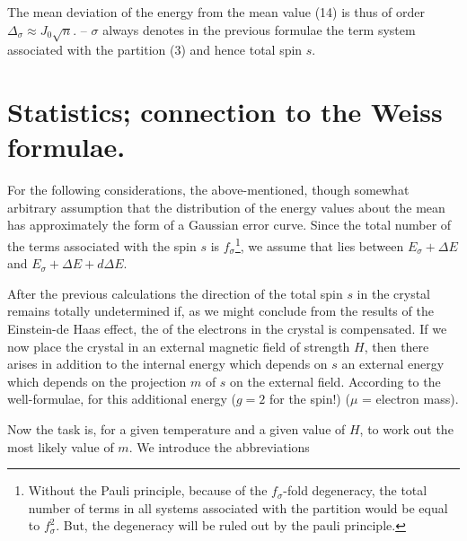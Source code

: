 \begin{paper}{1}
The mean deviation of the energy from the mean value (14) is thus of order $\Delta_\sigma \approx J_0 \sqrt{n}$. -- $\sigma$ always denotes in the previous formulae the term system associated with the partition (3) and hence total spin $s$.

\section{Statistics; connection to the Weiss formulae.}

For the following considerations, the above-mentioned, though somewhat arbitrary assumption that the distribution of the energy values about the mean has approximately the form of a Gaussian error curve. Since the total number of the terms associated with the spin $s$ is $f_\sigma$\footnote{Without the Pauli principle, because of the $f_\sigma$-fold degeneracy, the total number of terms in all systems associated with the partition would be equal to $f_\sigma^2$. But, the degeneracy will be ruled out by the pauli principle.}, we assume that
lies between $E_\sigma + \Delta E$ and $E_\sigma + \Delta E + d\Delta E$.

After the previous calculations the direction of the total spin $s$ in the crystal remains totally undetermined if, as we might conclude from the results of the Einstein-de Haas effect, the  of the electrons in the crystal is compensated. If we now place the crystal in an external magnetic field of strength $H$, then there arises in addition to the internal energy which depends on $s$ an external energy which depends on the projection $m$ of $s$ on the external field. According to the well-formulae, for this additional energy ($g=2$ for the spin!)
($\mu$ = electron mass).

Now the task is, for a given temperature and a given value of $H$, to work out the most likely value of $m$. We introduce the abbreviations


\end{paper}
